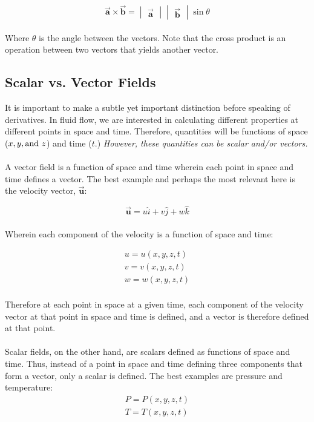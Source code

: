 \documentclass[11pt]{article}
\begin{document}
\begin{equation*}
    \vec{\bm{a}} \times \vec{\bm{b}} = \begin{vmatrix}
        \vec{\bm{a}}
    \end{vmatrix}\begin{vmatrix}
        \vec{\bm{b}}
    \end{vmatrix}
    \sin{\theta}
\end{equation*}\\

\noindent
Where $\theta$ is the angle between the vectors. Note that the cross product is an operation between two vectors that yields another vector.

\subsection{Scalar vs. Vector Fields}
It is important to make a subtle yet important distinction before speaking of derivatives. In fluid flow, we are interested in calculating different properties at different points in space and time. Therefore, quantities will be functions of space ($x, y, \textnormal{and}\ z$) and time ($t$.) \emph{However, these quantities can be scalar and/or vectors.}\\\\
\noindent
A vector field is a function of space and time wherein each point in space and time defines a vector. The best example and perhaps the most relevant here is the velocity vector, $\vec{\bm{u}}$:

\begin{equation*}
    \vec{\bm{u}} = u\hat{i} + v\hat{j} + w\hat{k}
\end{equation*}\\
\noindent
Wherein each component of the velocity is a function of space and time:


\begin{eqnarray*}
    u = u(x, y, z, t)\\
    v = v(x, y, z, t)\\
    w = w(x, y, z, t)
\end{eqnarray*}\\
\noindent
Therefore at each point in space at a given time, each component of the velocity vector at that point in space and time is defined, and a vector is therefore defined at that point.\\ \\
\noindent
Scalar fields, on the other hand, are scalars defined as functions of space and time. Thus, instead of a point in space and time defining three components that form a vector, only a scalar is defined. The best examples are pressure and temperature:
\begin{eqnarray*}
    P = P(x, y, z, t)\\
    T = T(x, y, z, t)\\
\end{eqnarray*}
\end{document}
